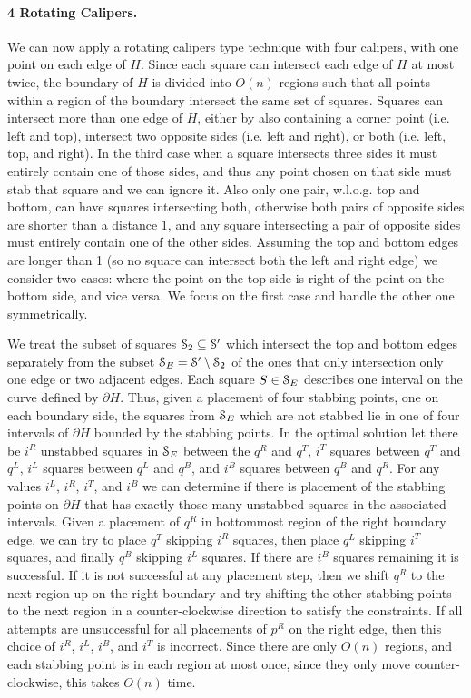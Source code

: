 \documentclass[11pt]{myclass}
\newcommand{\EuS}{\ensuremath{\EuScript{S}}}
\begin{document}
\paragraph{4 Rotating Calipers.}
We can now apply a rotating calipers type technique with four calipers, with one point on each edge of $H$.  Since each square can intersect each edge of $H$ at most twice, the boundary of $H$ is divided into $O(n)$ regions such that all points within a region of the boundary intersect the same set of squares.  Squares can intersect more than one edge of $H$, either by also containing a corner point (i.e. left and top), intersect two opposite sides (i.e. left and right), or both (i.e. left, top, and right).  In the third case when a square intersects three sides it must entirely contain one of those sides, and thus any point chosen on that side must stab that square and we can ignore it.  Also only one pair, w.l.o.g. top and bottom, can have squares intersecting both, otherwise both pairs of opposite sides are shorter than a distance $1$, and any square intersecting a pair of opposite sides must entirely contain one of the other sides.  Assuming the top and bottom edges are longer than 1 (so no square can intersect both the left and right edge) we consider two cases: where the point on the top side is right of the point on the bottom side, and vice versa.  We focus on the first case and handle the other one symmetrically.  

We treat the subset of squares $\EuS_2 \subseteq \EuS^\prime$ which intersect the top and bottom edges separately from the subset $\EuS_E = \EuS^\prime \setminus \EuS_2$ of the ones that only intersection only one edge or two adjacent edges.  
Each square $S \in \EuS_E$ describes one interval on the curve defined by $\partial H$.  Thus, given a placement of four stabbing points, one on each boundary side, the squares from $\EuS_E$ which are not stabbed lie in one of four intervals of $\partial H$ bounded by the stabbing points.  In the optimal solution let there be $i^R$ unstabbed squares in $\EuS_E$ between the $q^R$ and $q^T$, $i^T$ squares between $q^T$ and $q^L$, $i^L$ squares between $q^L$ and $q^B$, and $i^B$ squares between $q^B$ and $q^R$.  For any values $i^L$, $i^R$, $i^T$, and $i^B$ we can determine if there is placement of the stabbing points on $\partial H$ that has exactly those many unstabbed squares in the associated intervals.  
Given a placement of $q^R$ in bottommost region of the right boundary edge, we can try to place $q^T$ skipping $i^R$ squares, then place $q^L$ skipping $i^T$ squares, and finally $q^B$ skipping $i^L$ squares.  If there are $i^B$ squares remaining it is successful.  If it is not successful at any placement step, then we shift $q^R$ to the next region up on the right boundary and try shifting the other stabbing points to the next region in a counter-clockwise direction to satisfy the constraints.  If all attempts are unsuccessful for all placements of $p^R$ on the right edge, then this choice of $i^R$, $i^L$, $i^B$, and $i^T$ is incorrect.  Since there are only $O(n)$ regions, and each stabbing point is in each region at most once, since they only move counter-clockwise, this takes $O(n)$ time.  
\end{document}
